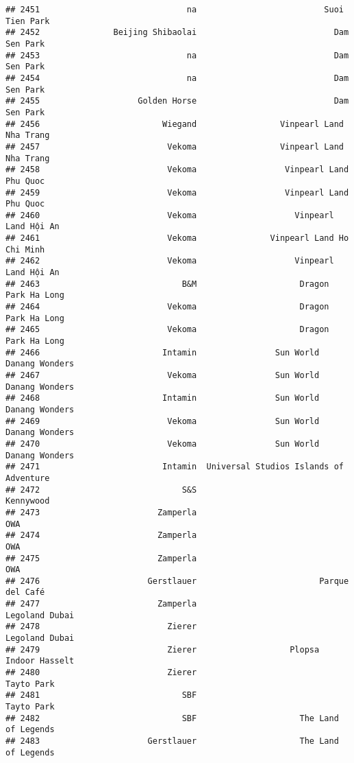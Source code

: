\documentclass[
]{article}
\begin{document}
\begin{verbatim}
## 2451                              na                          Suoi Tien Park
## 2452               Beijing Shibaolai                            Dam Sen Park
## 2453                              na                            Dam Sen Park
## 2454                              na                            Dam Sen Park
## 2455                    Golden Horse                            Dam Sen Park
## 2456                         Wiegand                 Vinpearl Land Nha Trang
## 2457                          Vekoma                 Vinpearl Land Nha Trang
## 2458                          Vekoma                  Vinpearl Land Phu Quoc
## 2459                          Vekoma                  Vinpearl Land Phu Quoc
## 2460                          Vekoma                    Vinpearl Land Hội An
## 2461                          Vekoma               Vinpearl Land Ho Chi Minh
## 2462                          Vekoma                    Vinpearl Land Hội An
## 2463                             B&M                     Dragon Park Ha Long
## 2464                          Vekoma                     Dragon Park Ha Long
## 2465                          Vekoma                     Dragon Park Ha Long
## 2466                         Intamin                Sun World Danang Wonders
## 2467                          Vekoma                Sun World Danang Wonders
## 2468                         Intamin                Sun World Danang Wonders
## 2469                          Vekoma                Sun World Danang Wonders
## 2470                          Vekoma                Sun World Danang Wonders
## 2471                         Intamin  Universal Studios Islands of Adventure
## 2472                             S&S                               Kennywood
## 2473                        Zamperla                                     OWA
## 2474                        Zamperla                                     OWA
## 2475                        Zamperla                                     OWA
## 2476                      Gerstlauer                         Parque del Café
## 2477                        Zamperla                          Legoland Dubai
## 2478                          Zierer                          Legoland Dubai
## 2479                          Zierer                   Plopsa Indoor Hasselt
## 2480                          Zierer                              Tayto Park
## 2481                             SBF                              Tayto Park
## 2482                             SBF                     The Land of Legends
## 2483                      Gerstlauer                     The Land of Legends

\end{verbatim}
\end{document}
